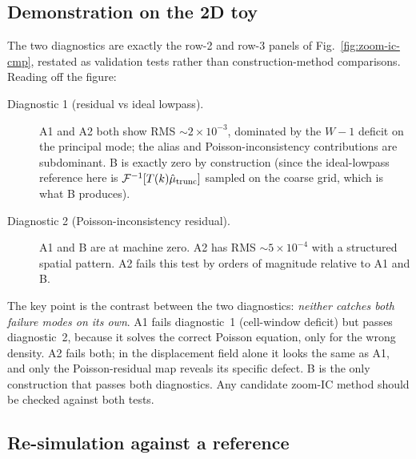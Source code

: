 \documentclass[12pt]{article}
\begin{document}
\subsection{Demonstration on the 2D toy}\label{sec:val-demo}

The two diagnostics are exactly the row-2 and row-3 panels of
Fig.~\ref{fig:zoom-ic-cmp}, restated as validation tests rather
than construction-method comparisons. Reading off the figure:
\begin{description}
\item[Diagnostic 1 (residual vs ideal lowpass).] A1 and A2 both
      show RMS $\sim 2\times 10^{-3}$, dominated by the $W{-}1$
      deficit on the principal mode; the alias and Poisson-inconsistency
      contributions are subdominant. B is exactly zero by
      construction (since the ideal-lowpass reference here is
      $\mathcal F^{-1}[T(k)\hat\mu_{\rm trunc}]$ sampled on the
      coarse grid, which is what B produces).
\item[Diagnostic 2 (Poisson-inconsistency residual).] A1 and B are
      at machine zero. A2 has RMS $\sim 5\times 10^{-4}$ with a
      structured spatial pattern. A2 fails this test by orders of
      magnitude relative to A1 and B.
\end{description}

The key point is the contrast between the two diagnostics: \emph{neither
catches both failure modes on its own}. A1 fails diagnostic~1
(cell-window deficit) but passes diagnostic~2, because it solves the
correct Poisson equation, only for the wrong density. A2 fails both;
in the displacement field alone it looks the same as A1, and only the
Poisson-residual map reveals its specific defect. B is the only
construction that passes both diagnostics. Any candidate zoom-IC
method should be checked against both tests.

\subsection{Re-simulation against a reference}\label{sec:val-resim}
\end{document}
